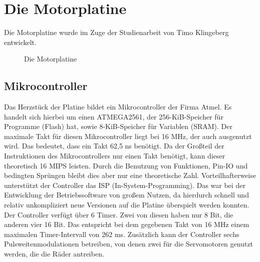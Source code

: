 \section{Die Motorplatine}
Die Motorplatine wurde im Zuge der Studienarbeit von Timo Klingeberg \cite{STUD_TIMO}
entwickelt.
\begin{figure}[htb]
 \centering
 \caption{\label{board}Die Motorplatine}
\end{figure}
\subsection{Mikrocontroller}
Das Herzstück der Platine bildet ein Mikrocontroller der Firma Atmel.
Es handelt sich hierbei um einen ATMEGA2561\cite{ATMEGA_MANUAL}, der 256-KiB-Speicher für
Programme (Flash) hat, sowie 8-KiB-Speicher für Variablen (SRAM). Der maximale Takt für
diesen Mikrocontroller liegt bei 16 MHz, der auch ausgenutzt wird. Das bedeutet, dass
ein Takt 62,5 ns benötigt. Da der Großteil der Instruktionen des Mikrocontrollers nur
einen Takt benötigt, kann dieser theoretisch 16 MIPS leisten. Durch die Benutzung
von Funktionen, Pin-IO und bedingten Sprüngen bleibt dies aber nur eine theoretische Zahl.
Vorteilhafterweise unterstützt der Controller das ISP (In-System-Programming). Das war bei der
Entwicklung der Betriebssoftware von großem Nutzen, da hierdurch schnell und relativ
unkompliziert neue Versionen auf die Platine überspielt werden konnten.\\
Der Controller verfügt über 6 Timer. Zwei von diesen haben nur 8 Bit, die anderen vier
16 Bit. Das entspricht bei dem gegebenen Takt von 16 MHz einem maximalen Timer-Intervall von 262 ms.
Zusätzlich kann der Controller sechs Pulsweitenmodulationen betreiben, von
denen zwei für die Servomotoren genutzt werden, die die Räder antreiben.

